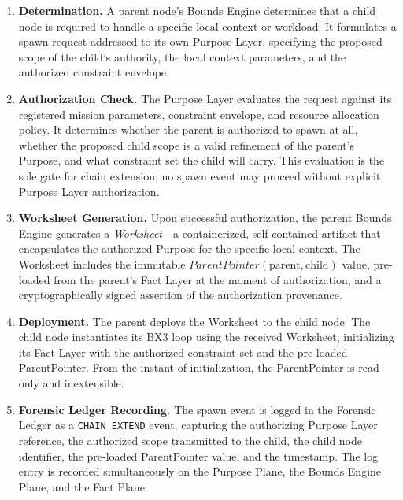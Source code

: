 \begin{enumerate}[noitemsep]
    \item \textbf{Determination.} A parent node's Bounds Engine determines that a child node is required to handle a specific local context or workload. It formulates a spawn request addressed to its own Purpose Layer, specifying the proposed scope of the child's authority, the local context parameters, and the authorized constraint envelope.

    \item \textbf{Authorization Check.} The Purpose Layer evaluates the request against its registered mission parameters, constraint envelope, and resource allocation policy. It determines whether the parent is authorized to spawn at all, whether the proposed child scope is a valid refinement of the parent's Purpose, and what constraint set the child will carry. This evaluation is the sole gate for chain extension; no spawn event may proceed without explicit Purpose Layer authorization.

    \item \textbf{Worksheet Generation.} Upon successful authorization, the parent Bounds Engine generates a \textit{Worksheet}—a containerized, self-contained artifact that encapsulates the authorized Purpose for the specific local context. The Worksheet includes the immutable $\textit{ParentPointer}(\text{parent}, \text{child})$ value, pre-loaded from the parent's Fact Layer at the moment of authorization, and a cryptographically signed assertion of the authorization provenance.

    \item \textbf{Deployment.} The parent deploys the Worksheet to the child node. The child node instantiates its BX3 loop using the received Worksheet, initializing its Fact Layer with the authorized constraint set and the pre-loaded ParentPointer. From the instant of initialization, the ParentPointer is read-only and inextensible.

    \item \textbf{Forensic Ledger Recording.} The spawn event is logged in the Forensic Ledger as a \texttt{CHAIN\_EXTEND} event, capturing the authorizing Purpose Layer reference, the authorized scope transmitted to the child, the child node identifier, the pre-loaded ParentPointer value, and the timestamp. The log entry is recorded simultaneously on the Purpose Plane, the Bounds Engine Plane, and the Fact Plane.
\end{enumerate}

